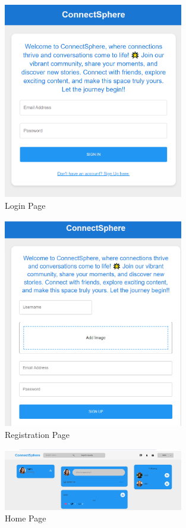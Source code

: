 \begin{figure}[h!]
    \centering
    \includegraphics[width=0.7\textwidth]{images/login.PNG}
    \caption{Login Page}
    \label{fig:login}
\end{figure}

\begin{figure}[h!]
    \centering
    \includegraphics[width=0.7\textwidth]{images/register.PNG}
    \caption{Registration Page}
    \label{fig:register}
\end{figure}

\begin{figure}[h!]
    \centering
    \includegraphics[width=0.7\textwidth]{images/Home.PNG}
    \caption{Home Page}
    \label{fig:home}
\end{figure}

